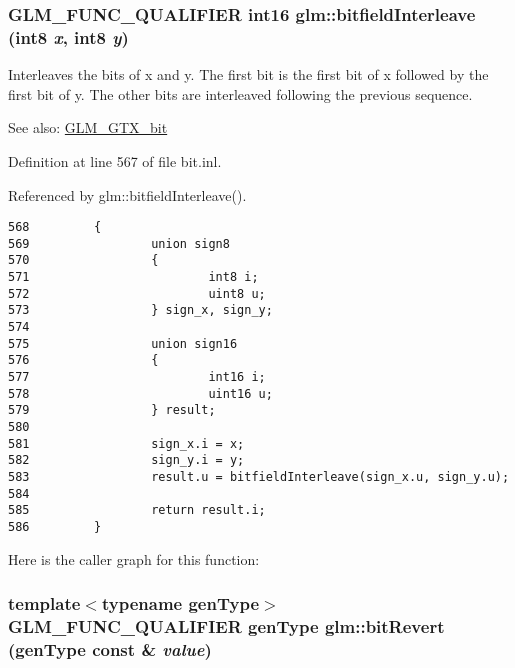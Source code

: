 \hypertarget{group__gtx__bit_g479134317bc95d99f2b2e235d3db287b}{
\subsubsection[bitfieldInterleave]{\setlength{\rightskip}{0pt plus 5cm}GLM\_\-FUNC\_\-QUALIFIER int16 glm::bitfieldInterleave (int8 {\em x}, \/  int8 {\em y})}}
\label{group__gtx__bit_g479134317bc95d99f2b2e235d3db287b}


Interleaves the bits of x and y. The first bit is the first bit of x followed by the first bit of y. The other bits are interleaved following the previous sequence.

\begin{Desc}
\item[See also:]\hyperlink{group__gtx__bit}{GLM\_\-GTX\_\-bit} \end{Desc}


Definition at line 567 of file bit.inl.

Referenced by glm::bitfieldInterleave().

\begin{Code}\begin{verbatim}568         {
569                 union sign8
570                 {
571                         int8 i;
572                         uint8 u;
573                 } sign_x, sign_y;
574 
575                 union sign16
576                 {
577                         int16 i;
578                         uint16 u;
579                 } result;
580 
581                 sign_x.i = x;
582                 sign_y.i = y;
583                 result.u = bitfieldInterleave(sign_x.u, sign_y.u);
584 
585                 return result.i;
586         }
\end{verbatim}
\end{Code}




Here is the caller graph for this function:\hypertarget{group__gtx__bit_g878bcf889f80259fcf86d0e25db92af4}{
\subsubsection[bitRevert]{\setlength{\rightskip}{0pt plus 5cm}template$<$typename genType$>$ GLM\_\-FUNC\_\-QUALIFIER genType glm::bitRevert (genType const \& {\em value})}}
\label{group__gtx__bit_g878bcf889f80259fcf86d0e25db92af4}


